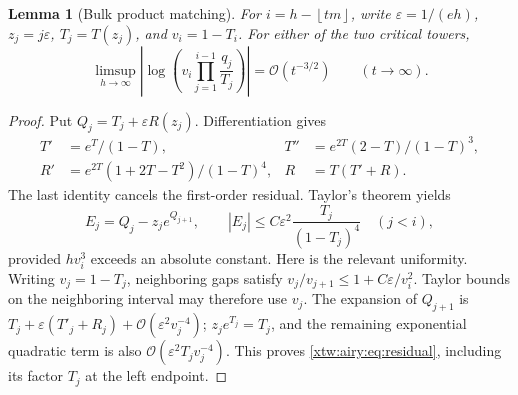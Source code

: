 \documentclass[11pt]{article}
\newtheorem{lemma}[theorem]{Lemma}
\theoremstyle{remark}\newtheorem{remark}[theorem]{Remark}
\newcommand{\OO}{\mathcal O}
\newcommand{\floor}[1]{\left\lfloor #1\right\rfloor}
\begin{document}
\begin{lemma}[Bulk product matching]\label{xtw:airy:lem:bulk}
For $i=h-\floor{tm}$, write $\varepsilon=1/(eh)$,
$z_j=j\varepsilon$, $T_j=T(z_j)$, and $v_i=1-T_i$. For either of the two
critical towers,
\begin{equation}\label{xtw:airy:eq:bulk}
 \limsup_{h\to\infty}\left|
 \log\!\left(v_i\prod_{j=1}^{i-1}\frac{q_j}{T_j}\right)\right|
 =\OO(t^{-3/2})\qquad(t\to\infty).
\end{equation}
\end{lemma}
\begin{proof}
Put $Q_j=T_j+\varepsilon R(z_j)$. Differentiation gives
\begin{align*}
 T'&=e^T/(1-T),&T''&=e^{2T}(2-T)/(1-T)^3,\\
 R'&=e^{2T}(1+2T-T^2)/(1-T)^4,&R&=T(T'+R).
\end{align*}
The last identity cancels the first-order residual. Taylor's theorem yields
\begin{equation}\label{xtw:airy:eq:residual}
 E_j=Q_j-z_je^{Q_{j+1}},\qquad
 |E_j|\le C\varepsilon^2\frac{T_j}{(1-T_j)^4}\quad(j<i),
\end{equation}
provided $h v_i^3$ exceeds an absolute constant. Here is the relevant uniformity.
Writing $v_j=1-T_j$, neighboring gaps satisfy
$v_j/v_{j+1}\le1+C\varepsilon/v_i^2$. Taylor bounds on the neighboring interval
may therefore use $v_j$. The expansion of $Q_{j+1}$ is
$T_j+\varepsilon(T'_j+R_j)+\OO(\varepsilon^2v_j^{-4})$;
$z_je^{T_j}=T_j$, and the remaining exponential quadratic term is also
$\OO(\varepsilon^2T_jv_j^{-4})$. This proves \eqref{xtw:airy:eq:residual}, including
its factor $T_j$ at the left endpoint.


\end{proof}
\end{document}
